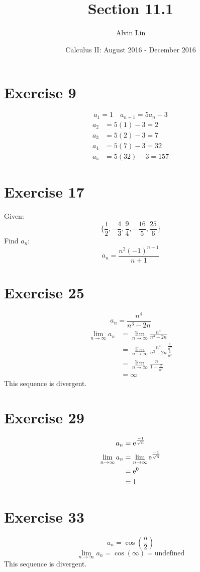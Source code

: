 \documentclass{math}
\title{Section 11.1}
\author{Alvin Lin}
\date{Calculus II: August 2016 - December 2016}
\begin{document}
\maketitle

\section*{Exercise 9}
\[ a_{1} = 1 \quad a_{n+1} = 5a_{n}-3 \]
\begin{align*}
  a_{2} &= 5(1)-3 = 2 \\
  a_{3} &= 5(2)-3 = 7 \\
  a_{4} &= 5(7)-3 = 32 \\
  a_{5} &= 5(32)-3 = 157
\end{align*}

\section*{Exercise 17}
Given:
\[ \bigg\{\frac{1}{2},-\frac{4}{3},
   \frac{9}{4},-\frac{16}{5},\frac{25}{6}\bigg\} \]
Find \( a_{n} \):
\[ a_{n} = \frac{n^{2}(-1)^{n+1}}{n+1} \]

\section*{Exercise 25}
\[ a_{n} = \frac{n^{4}}{n^{3}-2n} \]
\begin{align*}
  \lim_{n\to\infty}{a_{n}} &= \lim_{n\to\infty}{\frac{n^{4}}{n^{3}-2n}} \\
  &= \lim_{n\to\infty}{\frac{n^{4}}{n^{3}-2n}
    \frac{\frac{1}{n^{3}}}{\frac{1}{n^{3}}}} \\
  &= \lim_{n\to\infty}{\frac{n}{1-\frac{2}{n^{2}}}} \\
  &= \infty
\end{align*}
This sequence is divergent.

\section*{Exercise 29}
\[ a_{n} = \mathrm{e}^{\frac{-1}{\sqrt{n}}} \]
\begin{align*}
  \lim_{n\to\infty}{a_{n}} &= \lim_{n\to\infty}{\mathrm{e}^{\frac{-1}{\sqrt{n}}}} \\
  &= \mathrm{e}^{0} \\
  &= 1
\end{align*}

\section*{Exercise 33}
\[ a_{n} = \cos(\frac{n}{2}) \]
\[ \lim_{n\to\infty}{a_{n}} = \cos(\infty) = \mathrm{undefined} \]
This sequence is divergent.
\end{document}
